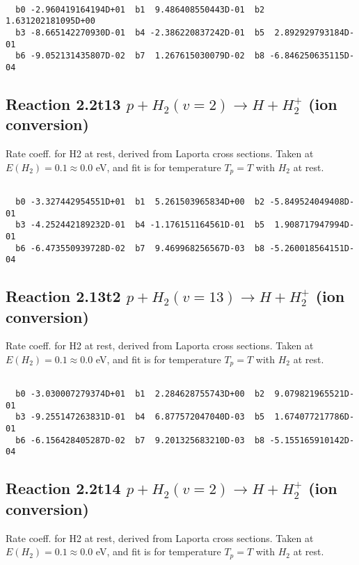 \begin{small}\begin{verbatim}

  b0 -2.960419164194D+01  b1  9.486408550443D-01  b2  1.631202181095D+00
  b3 -8.665142270930D-01  b4 -2.386220837242D-01  b5  2.892929793184D-01
  b6 -9.052131435807D-02  b7  1.267615030079D-02  b8 -6.846250635115D-04

\end{verbatim}\end{small}

\newpage
\subsection{
Reaction 2.2t13
$ p + H_2(v=2) \rightarrow H + H_2^+$ (ion conversion)
}
Rate coeff. for H2 at rest, derived from Laporta cross sections.
Taken at $E(H_2) = 0.1 \approx 0.0$ eV,  and fit is for temperature $T_p=T$ with $H_2$ at rest.

\begin{small}\begin{verbatim}

  b0 -3.327442954551D+01  b1  5.261503965834D+00  b2 -5.849524049408D-01
  b3 -4.252442189232D-01  b4 -1.176151164561D-01  b5  1.908717947994D-01
  b6 -6.473550939728D-02  b7  9.469968256567D-03  b8 -5.260018564151D-04

\end{verbatim}\end{small}

\newpage
\subsection{
Reaction 2.13t2
$ p + H_2(v=13) \rightarrow H + H_2^+$ (ion conversion)
}
Rate coeff. for H2 at rest, derived from Laporta cross sections.
Taken at $E(H_2) = 0.1 \approx 0.0$ eV,  and fit is for temperature $T_p=T$ with $H_2$ at rest.

\begin{small}\begin{verbatim}

  b0 -3.030007279374D+01  b1  2.284628755743D+00  b2  9.079821965521D-01
  b3 -9.255147263831D-01  b4  6.877572047040D-03  b5  1.674077217786D-01
  b6 -6.156428405287D-02  b7  9.201325683210D-03  b8 -5.155165910142D-04

\end{verbatim}\end{small}

\newpage
\subsection{
Reaction 2.2t14
$ p + H_2(v=2) \rightarrow H + H_2^+$ (ion conversion)
}
Rate coeff. for H2 at rest, derived from Laporta cross sections.
Taken at $E(H_2) = 0.1 \approx 0.0$ eV,  and fit is for temperature $T_p=T$ with $H_2$ at rest.

